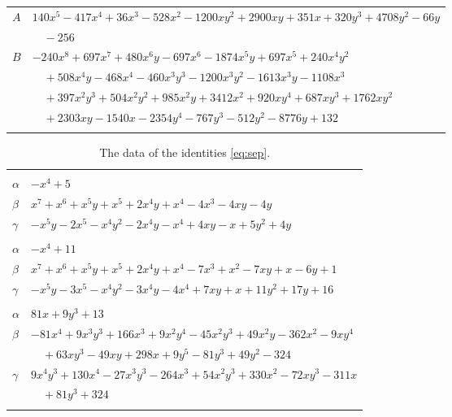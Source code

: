 \documentclass[11pt]{article}
\begin{document}
\begin{longtable}{@{}ll@{}}
$A$ & $140x^{5}-417x^{4}+36x^{3}-528x^{2}-1200xy^{2}+2900xy+351x+320y^{3}+4708y^{2}-66y$\\
 & $\quad -256$\\
$B$ & $-240x^{8}+697x^{7}+480x^{6}y-697x^{6}-1874x^{5}y+697x^{5}+240x^{4}y^{2}$\\
 & $\quad +508x^{4}y-468x^{4}-460x^{3}y^{3}-1200x^{3}y^{2}-1613x^{3}y-1108x^{3}$\\
 & $\quad +397x^{2}y^{3}+504x^{2}y^{2}+985x^{2}y+3412x^{2}+920xy^{4}+687xy^{3}+1762xy^{2}$\\
 & $\quad +2303xy-1540x-2354y^{4}-767y^{3}-512y^{2}-8776y+132$\\
\addlinespace[3pt]
\end{longtable}
\endgroup

\begingroup\footnotesize
\setlength{\LTcapwidth}{\textwidth}
\begin{longtable}{@{}ll@{}}
\caption{The data of the identities \eqref{eq:sep}.}\label{tab:sep}\\
\hline\endfirsthead\hline\endhead\hline\endfoot
\multicolumn{2}{@{}l}{$\{i,j\}=\{0,2\}$, $k_{ij}=2^{2}\cdot 5$}\\
$\alpha$ & $-x^{4}+5$\\
$\beta$ & $x^{7}+x^{6}+x^{5}y+x^{5}+2x^{4}y+x^{4}-4x^{3}-4xy-4y$\\
$\gamma$ & $-x^{5}y-2x^{5}-x^{4}y^{2}-2x^{4}y-x^{4}+4xy-x+5y^{2}+4y$\\
\addlinespace[3pt]
\multicolumn{2}{@{}l}{$\{i,j\}=\{0,5\}$, $k_{ij}=2^{2}\cdot 3\cdot 5$}\\
$\alpha$ & $-x^{4}+11$\\
$\beta$ & $x^{7}+x^{6}+x^{5}y+x^{5}+2x^{4}y+x^{4}-7x^{3}+x^{2}-7xy+x-6y+1$\\
$\gamma$ & $-x^{5}y-3x^{5}-x^{4}y^{2}-3x^{4}y-4x^{4}+7xy+x+11y^{2}+17y+16$\\
\addlinespace[3pt]
\multicolumn{2}{@{}l}{$\{i,j\}=\{0,7\}$, $k_{ij}=2^{2}\cdot 13$}\\
$\alpha$ & $81x+9y^{3}+13$\\
$\beta$ & $-81x^{4}+9x^{3}y^{3}+166x^{3}+9x^{2}y^{4}-45x^{2}y^{3}+49x^{2}y-362x^{2}-9xy^{4}$\\
 & $\quad +63xy^{3}-49xy+298x+9y^{5}-81y^{3}+49y^{2}-324$\\
$\gamma$ & $9x^{4}y^{3}+130x^{4}-27x^{3}y^{3}-264x^{3}+54x^{2}y^{3}+330x^{2}-72xy^{3}-311x$\\
 & $\quad +81y^{3}+324$\\
\addlinespace[3pt]
\multicolumn{2}{@{}l}{$\{i,j\}=\{0,8\}$, $k_{ij}=5$}\\

\end{longtable}
\end{document}

